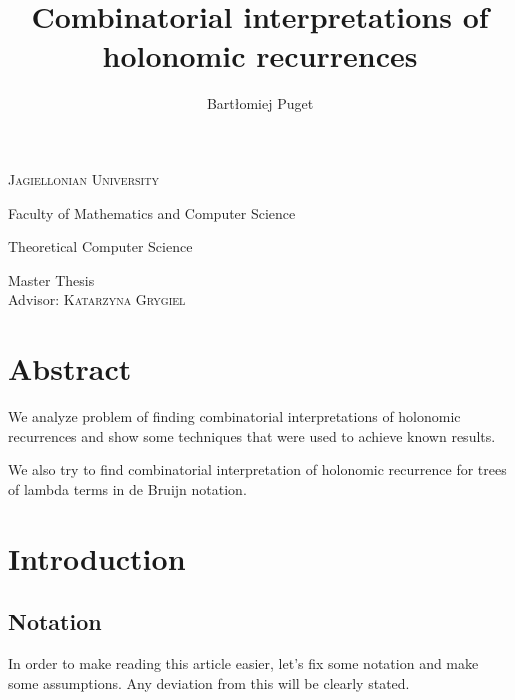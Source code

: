 \documentclass[final]{article}
\title{Combinatorial interpretations of holonomic recurrences}
\author{Bartłomiej Puget}
\theoremstyle{definition}
\theoremstyle{remark}
\begin{document}
\begin{titlepage}
	\begin{center}
	\textsc{\LARGE Jagiellonian University}

	\Large Faculty of Mathematics and Computer Science

	\Large Theoretical Computer Science

	\vfill

	\vspace{1cm}
	\hrulefill
	\vspace{0.5cm}

    \makeatletter
    \huge \textsc{\@title}
    \makeatother

	\vspace{0.2cm}
	\hrulefill

	\vspace{1cm}
    \makeatletter
	\textsc{\Large \@author}
    \makeatother

	\vspace{1cm}
    \normalsize

	Master Thesis\\
	Advisor: \textsc{Katarzyna Grygiel}

	\vfill

    \makeatletter
    \@date
    \makeatother
	\end{center}
\end{titlepage}

\section*{Abstract}

We analyze problem of finding combinatorial interpretations of holonomic recurrences and show some techniques that were used to achieve known results.

We also try to find combinatorial interpretation of holonomic recurrence for trees of lambda terms in de Bruijn notation.

\clearpage

\section{Introduction}

\subsection{Notation}

In order to make reading this article easier, let's fix some notation and make some assumptions. Any deviation from this will be clearly stated.
\end{document}
